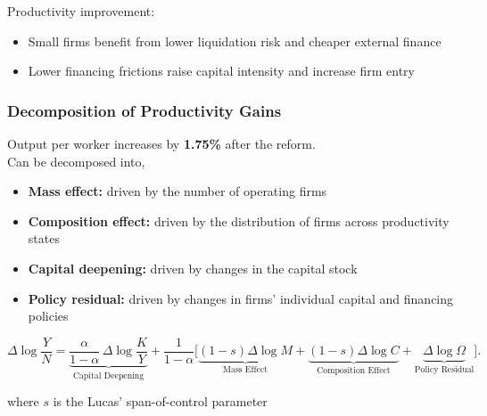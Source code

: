 \documentclass[aspectratio=169,xcolor=table]{beamer}
\begin{document}
\begin{frame}[label=effects]
\pause

Productivity improvement:
\begin{itemize} \small
    \item Small firms benefit from lower liquidation risk and cheaper external finance
    \item Lower financing frictions raise capital intensity and increase firm entry
\end{itemize}

\end{frame}


 

\begin{frame}[label=Decomp_main] \frametitle{Decomposition of Productivity Gains  \hfill  \hyperlink{decompA}{}}

Output per worker increases by \textbf{1.75\%} after the reform. \vspace{3mm} \\

Can be decomposed into,
\begin{itemize} \small
    \item \textbf{Mass effect:} driven by the number of operating firms  
    \item \textbf{Composition effect:} driven by the distribution of firms across productivity states  \vspace{1mm}
    \item \textbf{Capital deepening:} driven by changes in the capital stock
    \item \textbf{Policy residual:} driven by changes in firms’ individual capital and financing policies
\end{itemize} \normalsize


\[
\Delta\log\frac{Y}{N}
= \underbrace{\frac{\alpha}{1-\alpha}\,\Delta\log\frac{K}{Y}}_{\text{Capital Deepening}}
+ \frac{1}{1-\alpha}\Big[
\underbrace{(1-s)\Delta\log M}_{\text{Mass Effect}} +  
\underbrace{(1-s)\Delta\log C}_{\text{Composition Effect}} + 
\underbrace{\Delta\log\Omega}_{\text{Policy Residual}}\Big].
\] 

\small where $s$ is the Lucas' span-of-control parameter



\end{frame}
\end{document}
